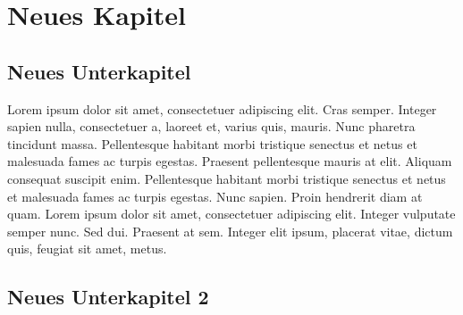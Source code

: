\chapter{Neues Kapitel}

\section{Neues Unterkapitel}

Lorem ipsum dolor sit amet, consectetuer adipiscing elit. Cras semper. Integer sapien nulla, consectetuer a, laoreet et, varius quis, mauris. Nunc pharetra tincidunt massa. Pellentesque habitant morbi tristique senectus et netus et malesuada fames ac turpis egestas. Praesent pellentesque mauris at elit. Aliquam consequat suscipit enim. Pellentesque habitant morbi tristique senectus et netus et malesuada fames ac turpis egestas. Nunc sapien. Proin hendrerit diam at quam. Lorem ipsum dolor sit amet, consectetuer adipiscing elit. Integer vulputate semper nunc. Sed dui. Praesent at sem. Integer elit ipsum, placerat vitae, dictum quis, feugiat sit amet, metus. 

\section{Neues Unterkapitel 2}